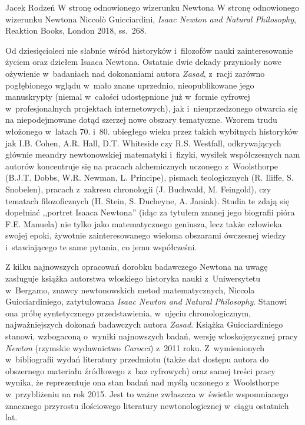 \begin{recplenv}{Jacek Rodzeń}
	{W stronę odnowionego wizerunku Newtona}
	{W stronę odnowionego wizerunku Newtona}
	{Niccolò Guicciardini, \textit{Isaac Newton and Natural Philosophy}, Reaktion Books, London 2018, ss.~268.}
		




Od dziesięcioleci nie słabnie wśród historyków i~filozofów nauki zainteresowanie życiem oraz dziełem Isaaca Newtona.
Ostatnie dwie dekady przyniosły nowe ożywienie w~badaniach nad dokonaniami autora \textit{Zasad}, z~racji zarówno
pogłębionego wglądu w~mało znane uprzednio, nieopublikowane jego manuskrypty (niemal w~całości udostępnione już w~formie
cyfrowej w~profesjonalnych projektach internetowych), jak i~nieuprzedzonego otwarcia się na niepodejmowane dotąd
szerzej nowe obszary tematyczne. Wzorem trudu włożonego w~latach 70. i~80. ubiegłego wieku przez takich wybitnych
historyków jak I.B. Cohen, A.R. Hall, D.T. Whiteside czy R.S. Westfall, odkrywających głównie meandry newtonowskiej
matematyki i~fizyki, wysiłek współczesnych nam autorów koncentruje się na pracach alchemicznych uczonego z~Woolsthorpe
(B.J.T. Dobbs, W.R. Newman, L. Principe), pismach teologicznych (R. Iliffe, S. Snobelen), pracach z~zakresu chronologii
(J. Buchwald, M. Feingold), czy tematach filozoficznych (H. Stein, S. Ducheyne, A. Janiak). Studia te zdają się
dopełniać ,,portret Isaaca Newtona'' (idąc za tytułem znanej jego biografii pióra F.E. Manuela) nie tylko jako
matematycznego geniusza, lecz także człowieka swojej epoki, żywotnie zainteresowanego wieloma obszarami ówczesnej
wiedzy i~stawiającego te same pytania, co jemu współcześni.

Z kilku najnowszych opracowań dorobku badawczego Newtona na uwagę zasługuje książka autorstwa włoskiego historyka
nauki z~Uniwersytetu w~Bergamo, znawcy newtonowskich metod matematycznych, Niccola Guicciardiniego, zatytułowana
\textit{Isaac Newton and Natural Philosophy}. Stanowi ona próbę syntetycznego przedstawienia, w~ujęciu chronologicznym,
najważniejszych dokonań badawczych autora \textit{Zasad}. Książka Guicciardiniego stanowi, wzbogaconą o~wyniki
najnowszych badań, wersję włoskojęzycznej pracy \textit{Newton} (rzymskie wydawnictwo \textit{Carocci}) z~2011
roku. Z~wymienionych w~bibliografii wydań literatury przedmiotu (także dat dostępu autora do obszernego materiału
źródłowego z~baz cyfrowych) oraz samej treści pracy wynika, że reprezentuje ona stan badań nad myślą
uczonego z~Woolsthorpe w~przybliżeniu na rok 2015. Jest to ważne zwłaszcza w~świetle wspomnianego
znacznego przyrostu ilościowego literatury
newtonologicznej w~ciągu ostatnich lat. 


\end{recplenv}
